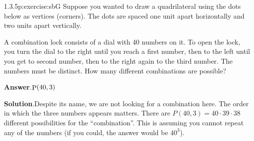 \documentclass[twoside,11pt,]{book}
\newcommand{\blocktitlefont}{\relax}
\numberwithin{equation}{chapter}
\begin{document}
\begin{divisionsolution}{1.3.5}{}{p:exercise:sbG}%
Suppose you wanted to draw a quadrilateral using the dots below as vertices (corners). The dots are spaced one unit apart horizontally and two units apart vertically.%
\begin{sidebyside}{1}{0.23}{0.23}{0}%
\begin{sbspanel}{0.54}%
%
\end{sbspanel}%
\end{sidebyside}%
\par\medskip
A combination lock consists of a dial with 40 numbers on it. To open the lock, you turn the dial to the right until you reach a first number, then to the left until you get to second number, then to the right again to the third number. The numbers must be distinct. How many different combinations are possible?%
\par\smallskip%
\noindent\textbf{\blocktitlefont Answer}.\quad{}\(\mathop{\rm P}\nolimits\!\left(40,3\right)\)%
\par\smallskip%
\noindent\textbf{\blocktitlefont Solution}.\quad{}Despite its name, we are not looking for a combination here. The order in which the three numbers appears matters. There are \(P(40,3) = 40\cdot 39 \cdot 38\) different possibilities for the ``combination''. This is assuming you cannot repeat any of the numbers (if you could, the answer would be \(40^3\)).%
\end{divisionsolution}%
\end{document}
